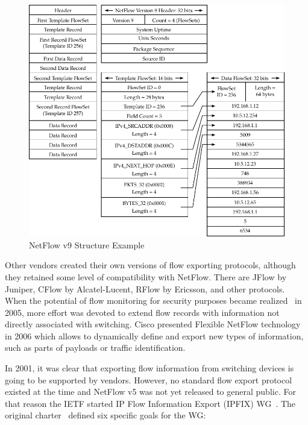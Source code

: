 \begin{figure}[t!]
  \begin{center}
    \includegraphics[width=\textwidth]{figures/nf9-protocol}
  \end{center}
  \caption{NetFlow v9 Structure Example}
  \label{fig:nf9-protocol}
\end{figure}

Other vendors created their own versions of flow exporting protocols, although they retained some level of compatibility with NetFlow. There are JFlow by Juniper, CFlow by Alcatel-Lucent, RFlow by Ericsson, and other protocols. When the potential of flow monitoring for security purposes became realized~\cite{CiscoSystems-2005-Cisco} in 2005, more effort was devoted to extend flow records with information not directly associated with switching. Cisco presented Flexible NetFlow technology~\cite{CiscoSystems-2008-Cisco} in 2006 which allows to dynamically define and export new types of information, such as parts of payloads or traffic identification.

In 2001, it was clear that exporting flow information from switching devices is going to be supported by vendors. However, no standard flow export protocol existed at the time and NetFlow v5 was not yet released to general public. For that reason the IETF started IP Flow Information Export (IPFIX) WG~\cite{IETF--IP}. The original charter~\cite{IESG-2001-IP} defined six specific goals for the WG: 

